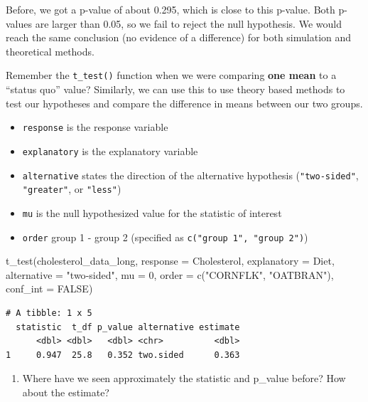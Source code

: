 \documentclass[
  letterpaper,
  DIV=11,
  numbers=noendperiod]{scrartcl}
\newenvironment{Shaded}{\begin{snugshade}}{\end{snugshade}}
\newcommand{\AttributeTok}[1]{\textcolor[rgb]{0.40,0.45,0.13}{#1}}
\newcommand{\ConstantTok}[1]{\textcolor[rgb]{0.56,0.35,0.01}{#1}}
\newcommand{\DecValTok}[1]{\textcolor[rgb]{0.68,0.00,0.00}{#1}}
\newcommand{\FunctionTok}[1]{\textcolor[rgb]{0.28,0.35,0.67}{#1}}
\newcommand{\NormalTok}[1]{\textcolor[rgb]{0.00,0.23,0.31}{#1}}
\newcommand{\StringTok}[1]{\textcolor[rgb]{0.13,0.47,0.30}{#1}}
\providecommand{\tightlist}{%
  \setlength{\itemsep}{0pt}\setlength{\parskip}{0pt}}\usepackage{longtable,booktabs,array}
\begin{document}
Before, we got a p-value of about 0.295, which is close to this p-value.
Both p-values are larger than 0.05, so we fail to reject the null
hypothesis. We would reach the same conclusion (no evidence of a
difference) for both simulation and theoretical methods.

Remember the \texttt{t\_test()} function when we were comparing
\textbf{one mean} to a ``status quo'' value? Similarly, we can use this
to use theory based methods to test our hypotheses and compare the
difference in means between our two groups.

\begin{itemize}
\tightlist
\item
  \texttt{response} is the response variable
\item
  \texttt{explanatory} is the explanatory variable
\item
  \texttt{alternative} states the direction of the alternative
  hypothesis (\texttt{"two-sided"}, \texttt{"greater"}, or
  \texttt{"less"})
\item
  \texttt{mu} is the null hypothesized value for the statistic of
  interest
\item
  \texttt{order} group 1 - group 2 (specified as
  \texttt{c("group\ 1",\ "group\ 2")})
\end{itemize}

\begin{Shaded}
\begin{Highlighting}[]
\FunctionTok{t\_test}\NormalTok{(cholesterol\_data\_long, }
       \AttributeTok{response =}\NormalTok{ Cholesterol, }
       \AttributeTok{explanatory =}\NormalTok{ Diet,}
       \AttributeTok{alternative =} \StringTok{"two{-}sided"}\NormalTok{,}
       \AttributeTok{mu =} \DecValTok{0}\NormalTok{,}
       \AttributeTok{order =} \FunctionTok{c}\NormalTok{(}\StringTok{"CORNFLK"}\NormalTok{, }\StringTok{"OATBRAN"}\NormalTok{),}
       \AttributeTok{conf\_int =} \ConstantTok{FALSE}\NormalTok{)}
\end{Highlighting}
\end{Shaded}

\begin{verbatim}
# A tibble: 1 x 5
  statistic  t_df p_value alternative estimate
      <dbl> <dbl>   <dbl> <chr>          <dbl>
1     0.947  25.8   0.352 two.sided      0.363
\end{verbatim}

\vspace{0.1in}

\begin{enumerate}
\def\labelenumi{\arabic{enumi}.}
\setcounter{enumi}{28}
\tightlist
\item
  Where have we seen approximately the statistic and p\_value before?
  How about the estimate?
\end{enumerate}
\end{document}
